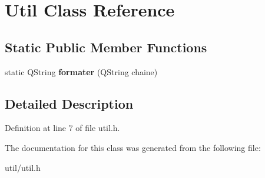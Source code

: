 \hypertarget{class_util}{
\section{Util Class Reference}
\label{class_util}
}
\subsection*{Static Public Member Functions}
\begin{DoxyCompactItemize}
\item 
\hypertarget{class_util_aa31b577b6cf24eb02bc901380159f979}{
static QString {\bfseries formater} (QString chaine)}
\label{class_util_aa31b577b6cf24eb02bc901380159f979}

\end{DoxyCompactItemize}


\subsection{Detailed Description}


Definition at line 7 of file util.h.



The documentation for this class was generated from the following file:\begin{DoxyCompactItemize}
\item 
util/util.h\end{DoxyCompactItemize}
